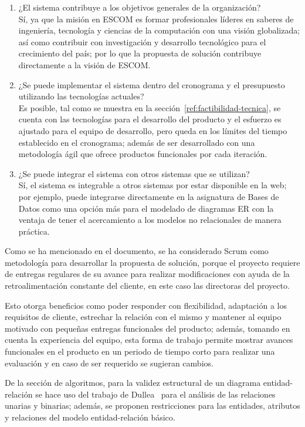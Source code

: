 \begin{enumerate}
    \item ¿El sistema contribuye a los objetivos generales de la organización?\\ Sí, ya que la misión en ESCOM es formar profesionales líderes en saberes de ingeniería, tecnología y ciencias de la computación con una visión globalizada; así como contribuir con investigación y desarrollo tecnológico para el crecimiento del país; por lo que la propuesta de solución contribuye directamente a la visión de ESCOM.
    \item ¿Se puede implementar el sistema dentro del cronograma y el presupuesto utilizando las tecnologías actuales? \\Es posible, tal como se muestra en la sección~\ref{ref:factibilidad-tecnica}, se cuenta con las tecnologías para el desarrollo del producto y el esfuerzo es ajustado para el equipo de desarrollo, pero queda en los límites del tiempo establecido en el cronograma; además de ser desarrollado con una metodología ágil que ofrece productos funcionales por cada iteración.
    \item ¿Se puede integrar el sistema con otros sistemas que se utilizan?\\ Sí, el sistema es integrable a otros sistemas por estar disponible en la web; por ejemplo, puede integrarse directamente en la asignatura de Bases de Datos como una opción más para el modelado de diagramas ER con la ventaja de tener el acercamiento a los modelos no relacionales de manera práctica.
\end{enumerate}


Como se ha mencionado en el documento, se ha considerado Scrum como metodología para desarrollar la propuesta de solución, porque el proyecto requiere de entregas regulares de su avance para realizar modificaciones con ayuda de la retroalimentación constante del cliente, en este caso las directoras del proyecto.


Esto otorga beneficios como poder responder con flexibilidad, adaptación a los requisitos de cliente, estrechar la relación con el mismo y mantener al equipo motivado con pequeñas entregas funcionales del producto; además, tomando en cuenta la experiencia del equipo, esta forma de trabajo permite mostrar avances funcionales en el producto en un periodo de tiempo corto para realizar una evaluación y en caso de ser requerido se sugieran cambios.


De la sección de algoritmos, para la validez estructural de un diagrama entidad-relación se hace uso del trabajo de Dullea~\cite{dullea_analysis_2003} para el análisis de las relaciones unarias y binarias; además, se proponen restricciones para las entidades, atributos y relaciones del modelo entidad-relación básico.


